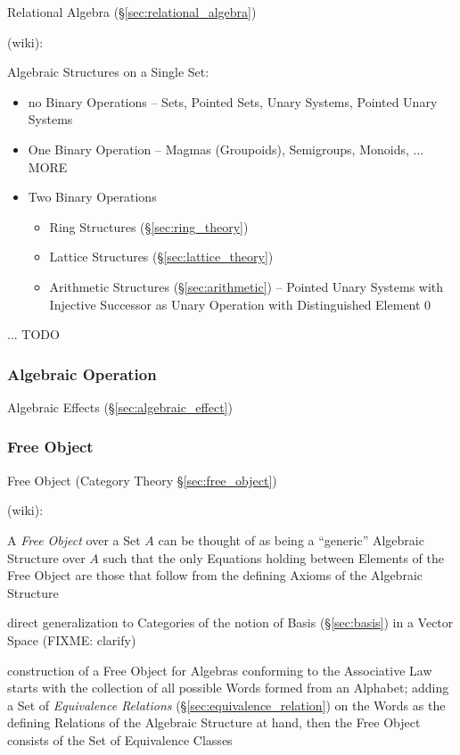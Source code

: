 \fist Relational Algebra (\S\ref{sec:relational_algebra})

(wiki):

Algebraic Structures on a Single Set:

\begin{itemize}
  \item no Binary Operations -- Sets, Pointed Sets, Unary Systems, Pointed
    Unary Systems
  \item One Binary Operation -- Magmas (Groupoids), Semigroups, Monoids, ...
    MORE
  \item Two Binary Operations
    \begin{itemize}
      \item Ring Structures (\S\ref{sec:ring_theory})
      \item Lattice Structures (\S\ref{sec:lattice_theory})
      \item Arithmetic Structures (\S\ref{sec:arithmetic}) -- Pointed Unary
        Systems with Injective Successor as Unary Operation with Distinguished
        Element $0$
    \end{itemize}
\end{itemize}

... TODO



\subsubsection{Algebraic Operation}\label{sec:algebraic_operation}

Algebraic Effects (\S\ref{sec:algebraic_effect})



\subsubsection{Free Object}\label{sec:universal_free_object}

\fist Free Object (Category Theory \S\ref{sec:free_object})

(wiki):

A \emph{Free Object} over a Set $A$ can be thought of as being a ``generic''
Algebraic Structure over $A$ such that the only Equations holding between
Elements of the Free Object are those that follow from the defining Axioms of
the Algebraic Structure

direct generalization to Categories of the notion of Basis (\S\ref{sec:basis})
in a Vector Space (FIXME: clarify)

construction of a Free Object for Algebras conforming to the Associative Law
starts with the collection of all possible Words formed from an Alphabet; adding
a Set of \emph{Equivalence Relations} (\S\ref{sec:equivalence_relation}) on the
Words as the defining Relations of the Algebraic Structure at hand, then the
Free Object consists of the Set of Equivalence Classes



